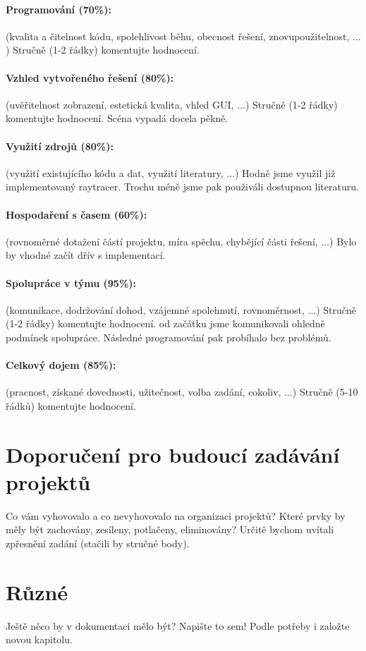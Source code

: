 \documentclass[12pt,a4paper,titlepage,final]{report}
\begin{document}
\paragraph{Programování (70\%):} (kvalita a čitelnost kódu, spolehlivost běhu,
obecnost řešení, znovupoužitelnost, $\ldots$)
Stručně (1-2 řádky) komentujte hodnocení. 

\paragraph{Vzhled vytvořeného řešení (80\%):} (uvěřitelnost zobrazení,
estetická kvalita, vhled GUI, $\ldots$)
Stručně (1-2 řádky) komentujte hodnocení. 
Scéna vypadá docela pěkně.

\paragraph{Využití zdrojů (80\%):} (využití existujícího kódu a dat, využití
literatury, $\ldots$)
Hodně jsme využil již implementovaný raytracer. Trochu méně jsme pak použiváli dostupnou literaturu.

\paragraph{Hospodaření s časem (60\%):} (rovnoměrné dotažení částí projektu,
míra spěchu, chybějící části řešení, $\ldots$)
Bylo by vhodné začít dřív s implementací.

\paragraph{Spolupráce v týmu (95\%):} (komunikace, dodržování dohod, vzájemné
spolehnutí, rovnoměrnost, $\ldots$)
Stručně (1-2 řádky) komentujte hodnocení. 
od začátku jsme komunikovali ohledně podmínek spolupráce. Následné programování pak probíhalo bez problémů.

\paragraph{Celkový dojem (85\%):} (pracnost, získané dovednosti, užitečnost,
volba zadání, cokoliv, $\ldots$)
Stručně (5-10 řádků) komentujte hodnocení. 

\section{Doporučení pro budoucí zadávání projektů}

Co vám vyhovovalo a co nevyhovovalo na organizaci projektů? Které prvky by měly
být zachovány, zesíleny, potlačeny, eliminovány?
Určitě bychom uvítali zpřesnění zadání (stačili by stručné body).

\section{Různé}

Ještě něco by v dokumentaci mělo být? Napište to sem! Podle potřeby i založte
novou kapitolu.
\end{document}
